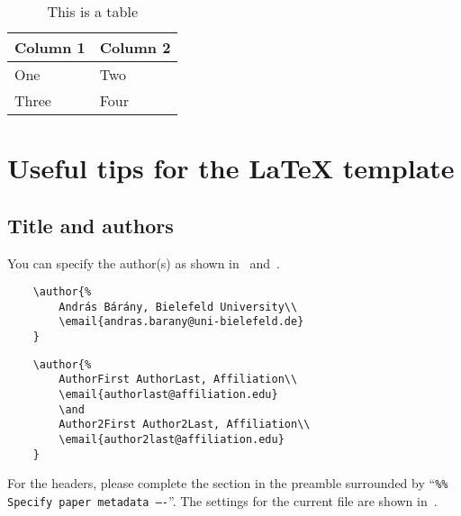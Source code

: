 \begin{table}[h]
    \centering
    \begin{tabular}{ll}
    \toprule
        Column 1 & Column 2 \\
    \midrule
        One & Two\\
        Three & Four\\
    \bottomrule
    \end{tabular}
    \caption{This is a table}
    \label{tab:table}
\end{table}

\section{Useful tips for the \LaTeX{} template}

\subsection{Title and authors}

You can specify the author(s) as shown in~
and~.

\begin{listing}[H]
    \begin{verbatim}
    \author{%
        András Bárány, Bielefeld University\\
        \email{andras.barany@uni-bielefeld.de}
    }
    \end{verbatim}
    \caption{Single author}\label{lst:author-single}
\end{listing}

\begin{listing}[H]
    \begin{verbatim}
    \author{%
        AuthorFirst AuthorLast, Affiliation\\
        \email{authorlast@affiliation.edu}
        \and
        Author2First Author2Last, Affiliation\\
        \email{author2last@affiliation.edu}
    }
    \end{verbatim}
    \caption{Multiple authors}\label{lst:author-multiple}
\end{listing}

For the headers, please complete the section in the preamble surrounded by
\enquote{\texttt{\%\% Specify paper metadata ----}}. The settings for the
current file are shown in~.

